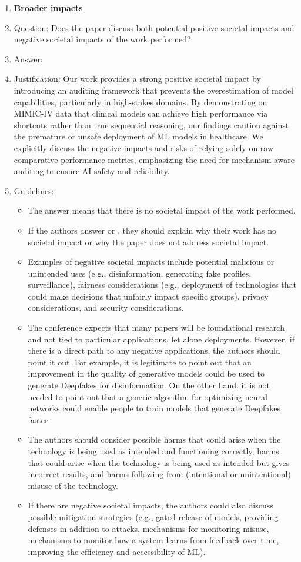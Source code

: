 \documentclass{article}
\theoremstyle{plain}
\theoremstyle{definition}
\theoremstyle{remark}
\begin{document}
\begin{enumerate}
\item {\bf Broader impacts}
    \item[] Question: Does the paper discuss both potential positive societal impacts and negative societal impacts of the work performed?
    \item[] Answer: \answerYes{}
    \item[] Justification: Our work provides a strong positive societal impact by introducing an auditing framework that prevents the overestimation of model capabilities, particularly in high-stakes domains. By demonstrating on MIMIC-IV data that clinical models can achieve high performance via shortcuts rather than true sequential reasoning, our findings caution against the premature or unsafe deployment of ML models in healthcare. We explicitly discuss the negative impacts and risks of relying solely on raw comparative performance metrics, emphasizing the need for mechanism-aware auditing to ensure AI safety and reliability.
    \item[] Guidelines:
    \begin{itemize}
        \item The answer \answerNA{} means that there is no societal impact of the work performed.
        \item If the authors answer \answerNA{} or \answerNo, they should explain why their work has no societal impact or why the paper does not address societal impact.
        \item Examples of negative societal impacts include potential malicious or unintended uses (e.g., disinformation, generating fake profiles, surveillance), fairness considerations (e.g., deployment of technologies that could make decisions that unfairly impact specific groups), privacy considerations, and security considerations.
        \item The conference expects that many papers will be foundational research and not tied to particular applications, let alone deployments. However, if there is a direct path to any negative applications, the authors should point it out. For example, it is legitimate to point out that an improvement in the quality of generative models could be used to generate Deepfakes for disinformation. On the other hand, it is not needed to point out that a generic algorithm for optimizing neural networks could enable people to train models that generate Deepfakes faster.
        \item The authors should consider possible harms that could arise when the technology is being used as intended and functioning correctly, harms that could arise when the technology is being used as intended but gives incorrect results, and harms following from (intentional or unintentional) misuse of the technology.
        \item If there are negative societal impacts, the authors could also discuss possible mitigation strategies (e.g., gated release of models, providing defenses in addition to attacks, mechanisms for monitoring misuse, mechanisms to monitor how a system learns from feedback over time, improving the efficiency and accessibility of ML).
    \end{itemize}
    

\end{enumerate}
\end{document}
